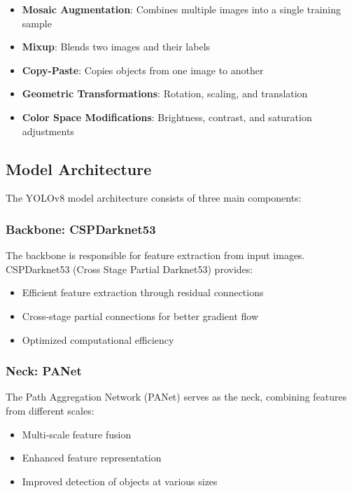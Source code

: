 \documentclass[12pt,a4paper]{article}
\begin{document}
\begin{itemize}
    \item \textbf{Mosaic Augmentation}: Combines multiple images into a single training sample
    \item \textbf{Mixup}: Blends two images and their labels
    \item \textbf{Copy-Paste}: Copies objects from one image to another
    \item \textbf{Geometric Transformations}: Rotation, scaling, and translation
    \item \textbf{Color Space Modifications}: Brightness, contrast, and saturation adjustments
\end{itemize}

\subsection{Model Architecture}

The YOLOv8 model architecture consists of three main components:

\subsubsection{Backbone: CSPDarknet53}

The backbone is responsible for feature extraction from input images. CSPDarknet53 (Cross Stage Partial Darknet53) provides:

\begin{itemize}
    \item Efficient feature extraction through residual connections
    \item Cross-stage partial connections for better gradient flow
    \item Optimized computational efficiency
\end{itemize}

\subsubsection{Neck: PANet}

The Path Aggregation Network (PANet) serves as the neck, combining features from different scales:

\begin{itemize}
    \item Multi-scale feature fusion
    \item Enhanced feature representation
    \item Improved detection of objects at various sizes
\end{itemize}
\end{document}

